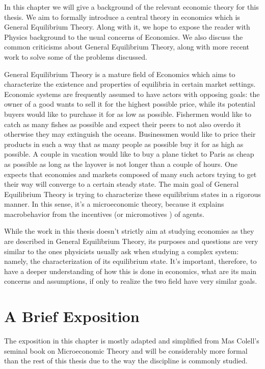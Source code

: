 In this chapter we will give a background of the relevant economic theory for this thesis. We aim to formally introduce a central theory in economics which is General Equilibrium Theory. Along with it, we hope to expose the reader with Physics background to the usual concerns of Economics. We also discuss the common criticisms about General Equilibrium Theory, along with more recent work to solve some of the problems discussed.

General Equilibrium Theory is a mature field of Economics \cite{Arrow54, mascolell, mckenzie} which aims to
characterize the existence and properties of equilibria in certain market settings. Economic systems are frequently assumed to have
actors with opposing goals: the owner of a good wants to sell it for the highest possible price, while its potential buyers would like to
purchase it for as low as possible. Fishermen would like to catch as many fishes as possible and expect their peers to not also overdo
it otherwise they may extinguish the oceans. Businessmen would like to price their products in such a way that as many people as possible buy it for as high as possible. A couple in vacation would like to buy a plane ticket to Paris as cheap as possible as long as the layover is not longer than a couple of hours. One expects that economies and markets composed of many such actors trying to get their way will converge to a certain steady state. The main goal of General Equilibrium Theory is trying to characterize these equilibrium states in a rigorous manner. In this sense, it's a microeconomic theory, because it explains macrobehavior from the incentives (or micromotives \cite{SchellingBook}) of agents.

While the work in this thesis doesn't strictly aim at studying economies as they are described in General Equilibrium Theory, its
purposes and questions are very similar to the ones physicists usually ask when studying a complex system: namely, the characterization
of its equilibrium state. It's important, therefore, to have a deeper understanding of how this is done in economics, what are its main
concerns and assumptions, if only to realize the two field have very similar goals.

\section{A Brief Exposition}

The exposition in this chapter is mostly adapted and simplified from Mas Colell's seminal book on Microeconomic Theory \cite{mascolell} and will be considerably more formal than the rest of this thesis due to the way the discipline is commonly studied.

